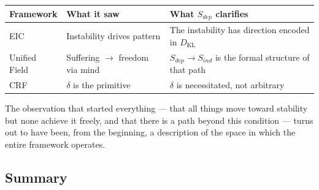 \documentclass[12pt, a4paper]{article}
\begin{document}
\begin{keybox}[title={$S_{dep}$ as the Unifying Concept}]
\begin{center}
\renewcommand{\arraystretch}{1.35}
\begin{tabular}{p{2.8cm} p{5cm} p{5cm}}
\toprule
\textbf{Framework} & \textbf{What it saw} & \textbf{What $S_{dep}$ clarifies} \\
\midrule
EIC & Instability drives pattern & The instability has direction encoded in $D_{\mathrm{KL}}$ \\
Unified Field & Suffering $\to$ freedom via mind & $S_{dep}\to S_{ind}$ is the formal structure of that path \\
CRF & $\delta$ is the primitive & $\delta$ is necessitated, not arbitrary \\
\bottomrule
\end{tabular}
\end{center}
\end{keybox}

The observation that started everything --- that all things move toward stability but
none achieve it freely, and that there is a path beyond this condition --- turns out
to have been, from the beginning, a description of the space in which the entire
framework operates.

\subsection*{Summary}
\end{document}
